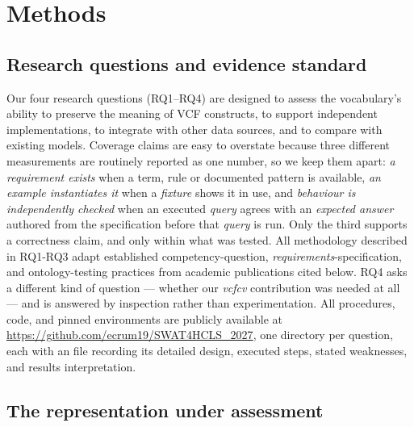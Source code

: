 \section{Methods}
\label{sec:methods}

\subsection{Research questions and evidence standard}
\label{sec:design}

Our four research questions (RQ1--RQ4) are designed to assess the vocabulary's ability to preserve the meaning of VCF constructs, to support independent implementations, to integrate with other data sources, and to compare with existing models.
Coverage claims are easy to overstate because three different measurements are routinely reported as one number, so we keep them apart: \emph{a requirement exists} when a term, rule or documented pattern is available, \emph{an example instantiates it} when a \emph{fixture} shows it in use, and \emph{behaviour is independently checked} when an executed \emph{query} agrees with an \emph{expected answer} authored from the specification before that \emph{query} is run.
Only the third supports a correctness claim, and only within what was tested.
All methodology described in RQ1-RQ3 adapt established competency-question, \emph{requirements}-specification, and ontology-testing practices from academic publications cited below.
RQ4 asks a different kind of question --- whether our \textit{vcfcv} contribution was needed at all --- and is answered by inspection rather than experimentation.
All procedures, code, and pinned environments are publicly available at \url{https://github.com/ecrum19/SWAT4HCLS_2027}, one directory per question, each with an  file recording its detailed design, executed steps, stated weaknesses, and results interpretation.

\subsection{The representation under assessment}
\label{sec:profiles}

